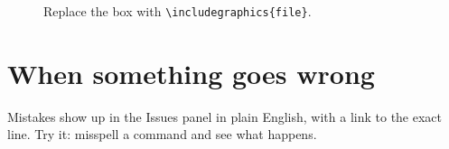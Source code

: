 \documentclass[11pt]{article}
\begin{document}
\begin{figure}[ht]
  \centering
  \caption{Replace the box with \texttt{\textbackslash includegraphics\{file\}}.}
  \label{fig:placeholder}
\end{figure}

\section{When something goes wrong}
Mistakes show up in the Issues panel in plain English, with a link to the
exact line. Try it: misspell a command and see what happens.



\end{document}
